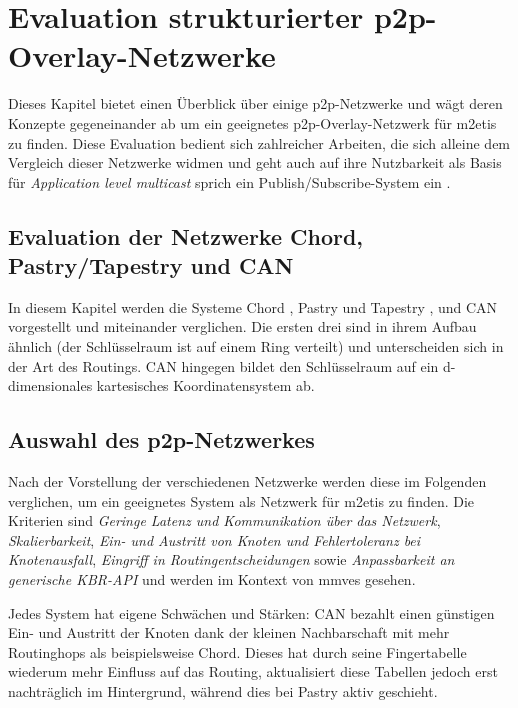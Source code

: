 \chapter{Evaluation strukturierter p2p-Overlay-Netzwerke}
\label{chap:evaluation_p2p}

Dieses Kapitel bietet einen Überblick über einige p2p-Netzwerke und wägt deren Konzepte gegeneinander ab um ein geeignetes p2p-Overlay-Netzwerk für \ac{m2etis} zu finden. Diese Evaluation bedient sich zahlreicher Arbeiten, die sich alleine dem Vergleich dieser Netzwerke widmen \cite{Lua2005Survey, Goetz2005, Li2004Comparing, Darlagiannis2006Peertopeer, Castro2002Secure, Bo2003PeertoPeer} und geht auch auf ihre Nutzbarkeit als Basis für \emph{Application level multicast} sprich ein Publish/Subscribe-System ein \cite{Hosseini2007Survey, Fahmy2007, Castro2003Evaluation, Ratnasamy2001}.

\section[Evaluation dreier p2p-Netzwerke]{Evaluation der Netzwerke Chord, Pastry/Tapestry und CAN}
In diesem Kapitel werden die Systeme Chord \cite{Stoica2003}, Pastry \cite{Rowstron2001} und Tapestry \cite{Zhao2001Tapestry,Zhao2004Tapestry}, und CAN \cite{Ratnasamy2001Scalable} vorgestellt und miteinander verglichen. Die ersten drei sind in ihrem Aufbau ähnlich (der Schlüsselraum ist auf einem Ring verteilt) und unterscheiden sich in der Art des Routings. CAN hingegen bildet den Schlüsselraum auf ein d-dimensionales kartesisches Koordinatensystem ab. 





\section{Auswahl des p2p-Netzwerkes}
Nach der Vorstellung der verschiedenen Netzwerke werden diese im Folgenden verglichen, um ein geeignetes System als Netzwerk für \ac{m2etis} zu finden. Die Kriterien sind \emph{Geringe Latenz und Kommunikation über das Netzwerk}, \emph{Skalierbarkeit}, \emph{Ein- und Austritt von Knoten und Fehlertoleranz bei Knotenausfall}, \emph{Eingriff in Routingentscheidungen} sowie \emph{Anpassbarkeit an generische KBR-API} und werden im Kontext von \acp{mmve} gesehen.

Jedes System hat eigene Schwächen und Stärken: CAN bezahlt einen günstigen Ein- und Austritt der Knoten dank der kleinen Nachbarschaft mit mehr Routinghops als beispielsweise Chord. Dieses hat durch seine Fingertabelle wiederum mehr Einfluss auf das Routing, aktualisiert diese Tabellen jedoch erst nachträglich im Hintergrund, während dies bei Pastry aktiv geschieht.

